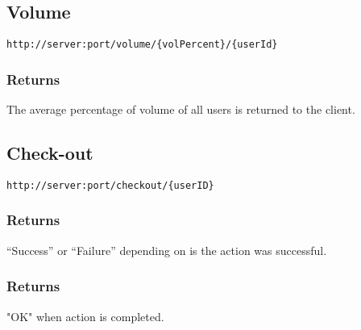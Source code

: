 \subsection{Volume}

\begin{lstlisting}[label={lst:endpoint_volume}, caption={Text surrounded by curly brackets are parameters.}]
http://server:port/volume/{volPercent}/{userId}
\end{lstlisting}

\subsubsection{Returns}
The average percentage of volume of all users is returned to the client.

\subsection{Check-out}

\begin{lstlisting}[label={lst:endpoint_checkout}, caption={Text surrounded by curly brackets are parameters.}]
http://server:port/checkout/{userID}
\end{lstlisting}

\subsubsection{Returns}
\enquote{Success} or \enquote{Failure} depending on is the action was successful.

\subsubsection{Returns}
"OK" when action is completed.

